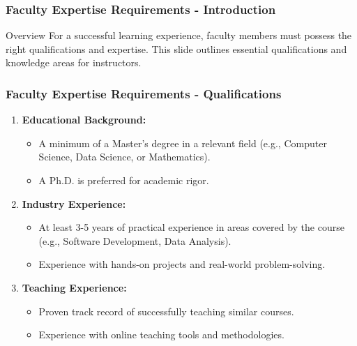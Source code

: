 \documentclass[aspectratio=169]{beamer}
\begin{document}
\begin{frame}[fragile]
    \frametitle{Faculty Expertise Requirements - Introduction}
    \begin{block}{Overview}
        For a successful learning experience, faculty members must possess the right qualifications and expertise. This slide outlines essential qualifications and knowledge areas for instructors.
    \end{block}
\end{frame}

\begin{frame}[fragile]
    \frametitle{Faculty Expertise Requirements - Qualifications}
    \begin{enumerate}
        \item \textbf{Educational Background:}
            \begin{itemize}
                \item A minimum of a Master's degree in a relevant field (e.g., Computer Science, Data Science, or Mathematics).
                \item A Ph.D. is preferred for academic rigor.
            \end{itemize}

        \item \textbf{Industry Experience:}
            \begin{itemize}
                \item At least 3-5 years of practical experience in areas covered by the course (e.g., Software Development, Data Analysis).
                \item Experience with hands-on projects and real-world problem-solving.
            \end{itemize}

        \item \textbf{Teaching Experience:}
            \begin{itemize}
                \item Proven track record of successfully teaching similar courses.
                \item Experience with online teaching tools and methodologies.
            \end{itemize}
    \end{enumerate}
\end{frame}
\end{document}
